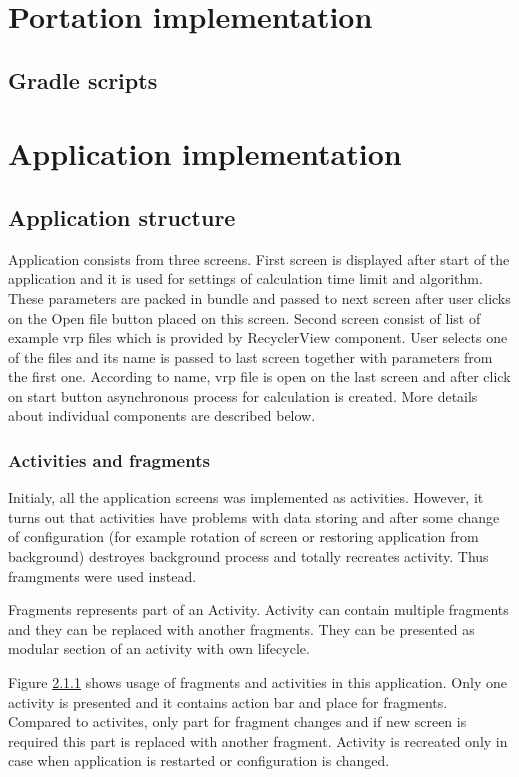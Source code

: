 \section{Portation implementation}
\subsection{Gradle scripts}


\section{Application implementation}

\subsection{Application structure} %
Application consists from three screens. First screen is displayed after start of the application and it is used for
settings of calculation time limit and algorithm. These parameters are packed in bundle and passed to next screen after
user clicks on the Open file button placed on this screen. Second screen consist of list of example vrp files which is
provided by RecyclerView component. User selects one of the files and its name is passed to last screen together with
parameters from the first one. According to name, vrp file is open on the last screen and after click on start button
asynchronous process for calculation is created. More details about individual components are described below.

\subsubsection{Activities and fragments}
Initialy, all the application screens was implemented as activities. However, it turns out that activities have problems
with data storing and after some change of configuration (for example rotation of screen or restoring application from
background) destroyes background process and totally recreates activity. Thus framgments were used instead.

Fragments represents part of an Activity. Activity can contain multiple fragments and they can be replaced with another
fragments. They can be presented as modular section of an activity with own lifecycle.

Figure \ref{} shows usage of fragments and activities in this application. Only one activity is presented and it
contains action bar and place for fragments. Compared to activites, only part for fragment changes and if new screen is
required this part is replaced with another fragment. Activity is recreated only in case when application is restarted
or configuration is changed.

